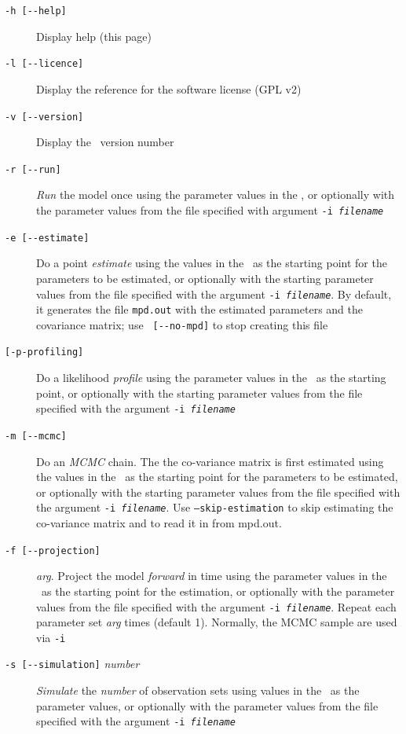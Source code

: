 \begin{description}
\item [\texttt{-h [-{}-help]}] Display help (this page)
\item [\texttt{-l [-{}-licence]}] Display the reference for the software license (GPL v2)
\item [\texttt{-v [-{}-version]}] Display the \CNAME~version number

\item [\texttt{-r [-{}-run]}] \emph{Run} the model once using the parameter values in the \config, or optionally with the parameter values from the file specified with argument \texttt{-i \emph{filename}}

\item [\texttt{-e [-{}-estimate]}] Do a point \emph{estimate} using the values in the \config~as the starting point for the parameters to be estimated, or optionally with the starting parameter values from the file specified with the argument \texttt{-i \emph{filename}}. By default, it generates the file \texttt{mpd.out} with the estimated parameters and the covariance matrix; use \texttt{ [-{}-no-mpd]} to stop creating this file

\item [ \texttt{[-{p}-profiling]}] Do a likelihood \emph{profile} using the parameter values in the \config~as the starting point, or optionally with the starting parameter values from the file specified with the argument \texttt{-i \emph{filename}}

\item [\texttt{-m [-{}-mcmc]}] Do an \emph{MCMC} chain. The the co-variance matrix is first estimated using the values in the \config~as the starting point for the parameters to be estimated, or optionally with the starting parameter values from the file specified with the argument \texttt{-i \emph{filename}}. Use \texttt{--skip-estimation} to skip estimating the co-variance matrix and to read it in from mpd.out.

\item [\texttt{-f [-{}-projection]}] \emph{arg}. Project the model \emph{forward} in time using the parameter values in the \config~as the starting point for the estimation, or optionally with the parameter values from the file specified with the argument \texttt{-i \emph{filename}}. Repeat each parameter set \emph{arg} times (default 1). Normally, the MCMC sample are used via \texttt{-i}

\item [\texttt{-s [-{}-simulation]} \emph{number}] \emph{Simulate} the \emph{number} of observation sets using values in the \config~as the parameter values, or optionally with the parameter values from the file specified with the argument \texttt{-i \emph{filename}}
\end{description}

